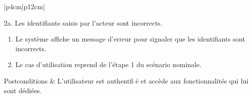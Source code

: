 \begin{longtable}{|p{4cm}|p{12cm}|}
\begin{minipage}[t]{\linewidth}
                        2a. Les identifiants saisis par l'acteur sont incorrects.
                        \begin{enumerate}[nosep,after=\strut]
                              \item Le système affiche un message d'erreur pour signaler que les identifiants sont incorrects.
                              \item Le cas d’utilisation reprend de l’étape 1 du scénario nominale.
                        \end{enumerate}
                    \end{minipage}
                    \hline
                    Postconditions & L'utilisateur est authentfié et accède aux fonctionnalités qui lui sont dédiées.  \\
                    \hline
                \caption{Description du cas d'utilisation « S'authentifier »}\\
            \end{longtable}
    
